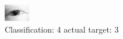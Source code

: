 \begin{figure}[h!]
\begin{center}
\includegraphics[width=0.60\columnwidth]{figures/ID125_class_4_target_3.png}
\end{center}
\caption{ Classification: 4 actual target: 3}
\label{fig:ID125_class_4_target_3}
\end{figure}
